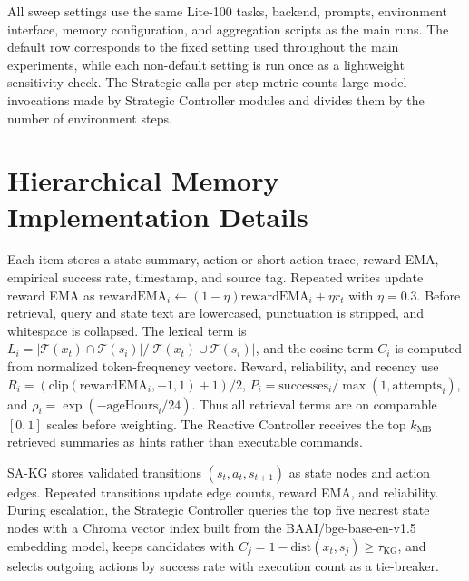 All sweep settings use the same Lite-100 tasks, backend, prompts, environment
interface, memory configuration, and aggregation scripts as the main runs. The
default row corresponds to the fixed setting used throughout the main
experiments, while each non-default setting is run once as a lightweight
sensitivity check. The Strategic-calls-per-step metric counts large-model
invocations made by Strategic Controller modules and divides them by the number
of environment steps.

\section{Hierarchical Memory Implementation Details}
\label{sec:appendix_memory_details}

\label{sec:appendix_memory_ranking_fusion}
Each \samb{} item stores a state summary, action or short action trace, reward
EMA, empirical success rate, timestamp, and source tag. Repeated writes update
reward EMA as $\mathrm{rewardEMA}_i\leftarrow(1-\eta)\mathrm{rewardEMA}_i+\eta r_t$
with $\eta=0.3$. Before retrieval, query and state text are lowercased,
punctuation is stripped, and whitespace is collapsed. The lexical term is
$L_i=|\mathcal{T}(x_t)\cap\mathcal{T}(s_i)|/
|\mathcal{T}(x_t)\cup\mathcal{T}(s_i)|$, and the cosine term $C_i$ is computed
from normalized token-frequency vectors. Reward, reliability, and recency use
$R_i=(\mathrm{clip}(\mathrm{rewardEMA}_i,-1,1)+1)/2$,
$P_i=\mathrm{successes}_i/\max(1,\mathrm{attempts}_i)$, and
$\rho_i=\exp(-\mathrm{ageHours}_i/24)$. Thus all retrieval terms are on
comparable $[0,1]$ scales before weighting. The Reactive Controller receives
the top $k_{\mathrm{MB}}$ retrieved summaries as hints rather than executable
commands.

SA-KG stores validated transitions $(s_t,a_t,s_{t+1})$ as state nodes and
action edges. Repeated transitions update edge counts, reward EMA, and
reliability. During escalation, the Strategic Controller queries the top five
nearest state nodes with a Chroma vector index built from the
BAAI/bge-base-en-v1.5 embedding model, keeps candidates with
$C_j=1-\mathrm{dist}(x_t,s_j)\ge\tau_{\mathrm{KG}}$, and selects outgoing
actions by success rate with execution count as a tie-breaker.

